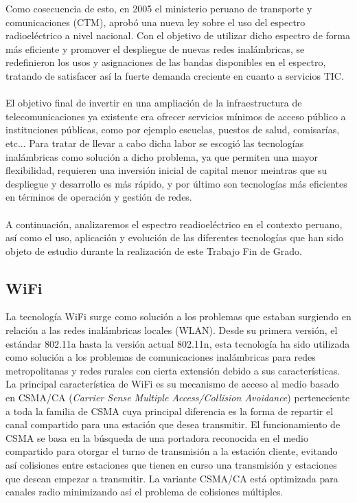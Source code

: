 Como cosecuencia de esto, en 2005 el ministerio peruano de transporte y comunicaciones (CTM), aprobó una nueva ley sobre el uso del espectro radioeléctrico a nivel nacional. Con el objetivo de utilizar dicho espectro de forma más eficiente y promover el despliegue de nuevas redes inalámbricas, se redefinieron los usos y asignaciones de las bandas disponibles en el espectro, tratando de satisfacer así la fuerte demanda creciente en cuanto a servicios TIC. \\\\

El objetivo final de invertir en una ampliación de la infraestructura de telecomunicaciones ya existente era ofrecer servicios mínimos de acceso público a instituciones públicas, como por ejemplo escuelas, puestos de salud, comisarías, etc... Para tratar de llevar a cabo dicha labor se escogió las tecnologías inalámbricas como solución a dicho problema, ya que permiten una mayor flexibilidad, requieren una inversión inicial de capital menor meintras que su despliegue y desarrollo es más rápido, y por último son tecnologías más eficientes en términos de operación y gestión de redes.\\\\

A continuación, analizaremos el espectro readioeléctrico en el contexto peruano, así como el uso, aplicación y evolución de las diferentes tecnologías que han sido objeto de estudio durante la realización de este Trabajo Fin de Grado.

\subsection{WiFi}
La tecnología WiFi surge como solución a los problemas que estaban surgiendo en relación a las redes inalámbricas locales (WLAN). Desde su primera versión, el estándar 802.11a hasta la versión actual 802.11n, esta tecnología ha sido utilizada como solución a los problemas de comunicaciones inalámbricas para redes metropolitanas y redes rurales con cierta extensión debido a sus características. La principal característica de WiFi es su mecanismo de acceso al medio basado en CSMA/CA (\textit{Carrier Sense Multiple Access/Collision Avoidance}) perteneciente a toda la familia de CSMA cuya principal diferencia es la forma de repartir el canal compartido para una estación que desea transmitir. El funcionamiento de CSMA se basa en la búsqueda de una portadora reconocida en el medio compartido para otorgar el turno de transmisión a la estación cliente, evitando así colisiones entre estaciones que tienen en curso una transmisión y estaciones que desean empezar a transmitir. La variante CSMA/CA está optimizada para canales radio minimizando así el problema de colisiones múltiples.\\\\

